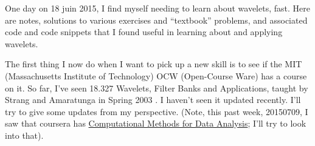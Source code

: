\documentclass[twoside]{amsart}
\theoremstyle{plain}
\theoremstyle{definition}
\theoremstyle{remark}
\numberwithin{equation}{section}
\begin{document}
\maketitle

One day on 18 juin 2015, I find myself needing to learn about wavelets, fast.  Here are notes, solutions to various exercises and ``textbook'' problems, and associated code and code snippets that I found useful in learning about and applying wavelets.  

The first thing I now do when I want to pick up a new skill is to see if the MIT (Massachusetts Institute of Technology) OCW (Open-Course Ware) has a course on it.  So far, I've seen 18.327 Wavelets, Filter Banks and Applications, taught by Strang and Amaratunga in Spring 2003 \cite{GStrangKAmaratunga2003}.  I haven't seen it updated recently.  I'll try to give some updates from my perspective. (Note, this past week, 20150709, I saw that coursera has \href{https://www.coursera.org/course/compmethods}{Computational Methods for Data Analysis}; I'll try to look into that).  
\end{document}
